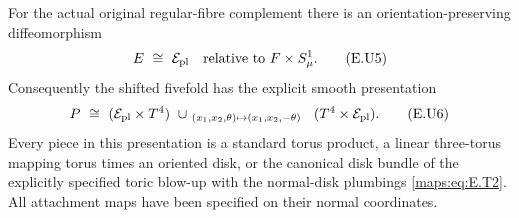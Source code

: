 \begin{proposition}
For the actual original regular-fibre complement there is an
orientation-preserving diffeomorphism
\[
                  E\ \cong\ \mathcal E_{\rm pl}
                 \quad\hbox{relative to }F\times S^1_\mu .
 \tag{E.U5}\label{maps:eq:E.U5}
\]
Consequently the shifted fivefold has the explicit smooth
presentation
\[
 P\ \cong\
 (\mathcal E_{\rm pl}\times T^4)
 \ \cup_{\ (x_1,x_2,\theta)\mapsto(x_1,x_2,-\theta)\ }\
 (T^4\times\mathcal E_{\rm pl}).
 \tag{E.U6}\label{maps:eq:E.U6}
\]
Every piece in this presentation is a standard torus product,
a linear three-torus mapping torus times an oriented disk, or
the canonical disk bundle of the explicitly specified toric
blow-up with the normal-disk plumbings \eqref{maps:eq:E.T2}.  All attachment
maps have been specified on their normal coordinates.

\end{proposition}


